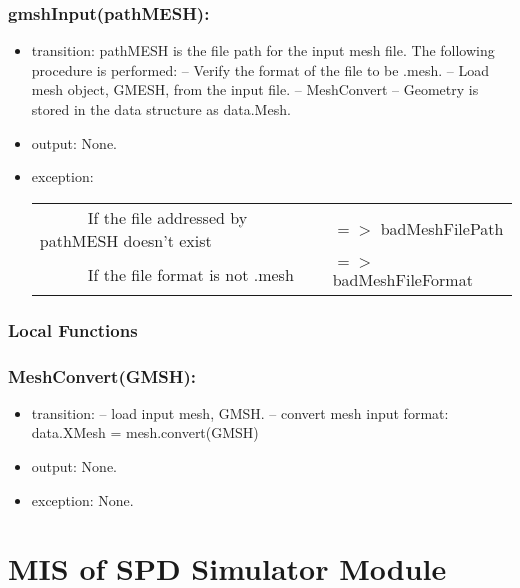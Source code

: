 \documentclass[12pt, titlepage]{article}
\begin{document}
\subsubsection*{gmshInput(pathMESH):}
\begin{itemize}
	\item transition: pathMESH is the file path for the input mesh file. The following procedure is performed:
	\subitem -- Verify the format of the file to be .mesh.
	\subitem -- Load mesh object, GMESH, from the input file. 
	\subitem -- MeshConvert
	\subitem -- Geometry is stored in the data structure as data.Mesh.
	
	\item output: None.
	\item exception: 
		\noindent \begin{longtable*}[l]{l l}
		\ \ \ \ \ \ If the file addressed by pathMESH doesn't exist & $=>$ badMeshFilePath\\
		\ \ \ \ \ \ If the file format is not .mesh & $=>$ badMeshFileFormat\\
	\end{longtable*}
	 
\end{itemize}


\subsubsection{Local Functions}

\subsubsection*{MeshConvert(GMSH):}
\begin{itemize}
	\item transition: 
	\subitem -- load input mesh, GMSH.
	\subitem -- convert mesh input format:
	\subsubitem data.XMesh = mesh.convert(GMSH) 
	\item output: None. 
	\item exception: None.
\end{itemize}

\newpage
%
%
%
%
\section{MIS of SPD Simulator Module} \label{SSM} 


\end{document}
